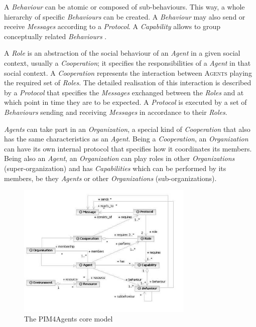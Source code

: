 A \textit{Behaviour} can be atomic or composed of sub-behaviours.
This way, a whole hierarchy of specific \textit{Behaviours} can be created.
A \textit{Behaviour} may also send or receive \textit{Messages} according to a \textit{Protocol}.
A \textit{Capability} allows to group conceptually related \textit{Behaviours} \cite{Hahn07b}.

A \textit{Role} is an abstraction of the social behaviour of an \textit{Agent} in a given social context, usually a \textit{Cooperation}; it specifies the responsibilities of a \textit{Agent} in that social context.
A \textit{Cooperation} represents the interaction between \textsc{Agents} playing the required set of \textit{Roles}.
The detailed realisation of this interaction is described by a \textit{Protocol} that specifies the \textit{Messages} exchanged between the \textit{Roles} and at which point in time they are to be expected.
A \textit{Protocol} is executed by a set of \textit{Behaviours} sending and receiving \textit{Messages} in accordance to their \textit{Roles}.

\textit{Agents} can take part in an \textit{Organization}, a special kind of \textit{Cooperation} that also has the same characteristics as an \textit{Agent}.
Being a \textit{Cooperation}, an \textit{Organization} can have its own internal protocol that specifies how it coordinates its members.
Being also an \textit{Agent}, an \textit{Organization} can play roles in other \textit{Organizations} (super-organization) and has \textit{Capabilities} which can be performed by its members, be they \textit{Agents} or other \textit{Organizations} (sub-organizations).

\begin{figure}[ht]
	\centering
	\includegraphics[width=0.75\textwidth]{images/pim4agents/pim4agents-metamodel.png}
	\caption{The PIM4Agents core model}
	\label{figure:pim4agents-metamodel}
\end{figure}

